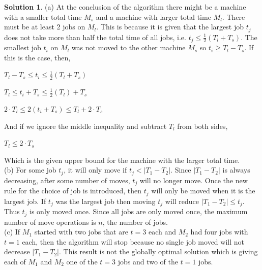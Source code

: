 \documentclass{article}
\theoremstyle{definition}
\newtheorem*{solution}{Solution}
\begin{document}
\begin{solution}

(a) At the conclusion of the algorithm there might be a machine with a smaller total time \(M_s\) and a machine with larger total time \(M_l\). There must be at least 2 jobs on \(M_l\). This is because it is given that the largest job \(t_j\) does not take more than half the total time of all jobs, i.e. \(t_j\leq  \frac{1}{2} (T_l+T_s) \).  The smallest job \(t_i\) on \(M_l\) was not moved to the other machine \(M_s\) so \(t_i\geq T_l-T_s\). If this is the case, then,

\(T_l-T_s\leq t_i \leq \frac{1}{2} (T_l+T_s) \)

\(T_l\leq t_i+T_s \leq \frac{1}{2} (T_l)+T_s \)

\(2\cdot T_l\leq 2(t_i+T_s) \leq T_l+2\cdot T_s \)

And if we ignore the middle inequality and subtract \(T_l\) from both sides,

\(T_l\leq 2\cdot T_s \)

Which is the given upper bound for the machine with the larger total time. \\

(b) For some job \(t_j\), it will only move if \(t_j<|T_1-T_2|\). Since \(|T_1-T_2|\) is always decreasing, after some number of moves, \(t_j\) will no longer move. Once the new rule for the choice of job is introduced, then \(t_j\) will  only be moved when it is the largest job. If \(t_j\) was the largest job then moving \(t_j\) will reduce \(|T_1-T_2|\leq t_j\). Thus \(t_j\) is only moved once. Since all jobs are only moved once, the maximum number of move operations is \(n\), the number of jobs. \\

(c) If \(M_1\) started with two jobs that are \(t=3\) each and \(M_2\) had four jobs with \(t=1\) each, then the algorithm will stop because no single job moved will not decrease \(|T_1-T_2|\). This result is not the globally optimal solution which is giving each of \(M_1\) and \(M_2\) one of the \(t=3\) jobs and two of the \(t=1\) jobs.

\end{solution}
\end{document}
